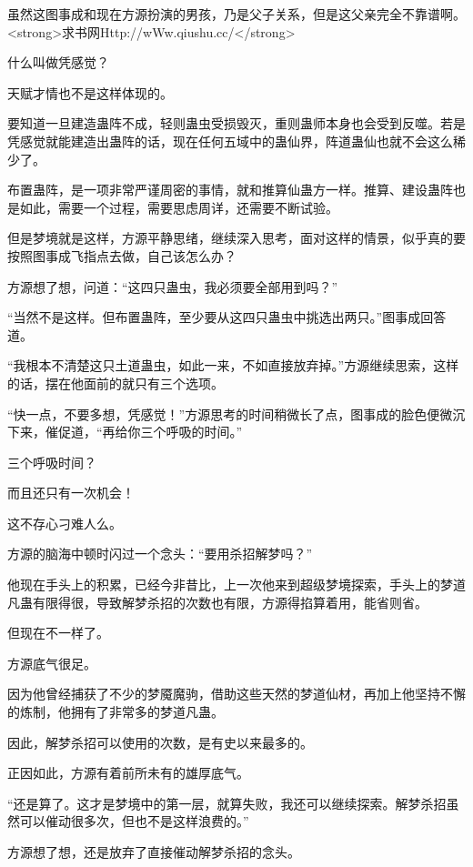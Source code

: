 
\begin{this_body}

虽然这图事成和现在方源扮演的男孩，乃是父子关系，但是这父亲完全不靠谱啊。<strong>求书网Http://wWw.qiushu.cc/</strong>

什么叫做凭感觉？

天赋才情也不是这样体现的。

要知道一旦建造蛊阵不成，轻则蛊虫受损毁灭，重则蛊师本身也会受到反噬。若是凭感觉就能建造出蛊阵的话，现在任何五域中的蛊仙界，阵道蛊仙也就不会这么稀少了。

布置蛊阵，是一项非常严谨周密的事情，就和推算仙蛊方一样。推算、建设蛊阵也是如此，需要一个过程，需要思虑周详，还需要不断试验。

但是梦境就是这样，方源平静思绪，继续深入思考，面对这样的情景，似乎真的要按照图事成飞指点去做，自己该怎么办？

方源想了想，问道：“这四只蛊虫，我必须要全部用到吗？”

“当然不是这样。但布置蛊阵，至少要从这四只蛊虫中挑选出两只。”图事成回答道。

“我根本不清楚这只土道蛊虫，如此一来，不如直接放弃掉。”方源继续思索，这样的话，摆在他面前的就只有三个选项。

“快一点，不要多想，凭感觉！”方源思考的时间稍微长了点，图事成的脸色便微沉下来，催促道，“再给你三个呼吸的时间。”

三个呼吸时间？

而且还只有一次机会！

这不存心刁难人么。

方源的脑海中顿时闪过一个念头：“要用杀招解梦吗？”

他现在手头上的积累，已经今非昔比，上一次他来到超级梦境探索，手头上的梦道凡蛊有限得很，导致解梦杀招的次数也有限，方源得掐算着用，能省则省。

但现在不一样了。

方源底气很足。

因为他曾经捕获了不少的梦魇魔驹，借助这些天然的梦道仙材，再加上他坚持不懈的炼制，他拥有了非常多的梦道凡蛊。

因此，解梦杀招可以使用的次数，是有史以来最多的。

正因如此，方源有着前所未有的雄厚底气。

“还是算了。这才是梦境中的第一层，就算失败，我还可以继续探索。解梦杀招虽然可以催动很多次，但也不是这样浪费的。”

方源想了想，还是放弃了直接催动解梦杀招的念头。


\end{this_body}
